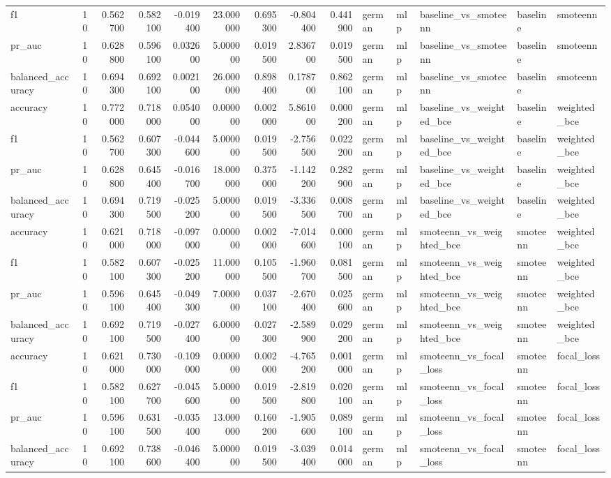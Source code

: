 \begin{tabular}{lrrrrrrrrlllll}
f1 & 10 & 0.562700 & 0.582100 & -0.019400 & 23.000000 & 0.695300 & -0.804400 & 0.441900 & german & mlp & baseline_vs_smoteenn & baseline & smoteenn \\
pr_auc & 10 & 0.628800 & 0.596100 & 0.032600 & 5.000000 & 0.019500 & 2.836700 & 0.019500 & german & mlp & baseline_vs_smoteenn & baseline & smoteenn \\
balanced_accuracy & 10 & 0.694300 & 0.692100 & 0.002100 & 26.000000 & 0.898400 & 0.178700 & 0.862100 & german & mlp & baseline_vs_smoteenn & baseline & smoteenn \\
accuracy & 10 & 0.772000 & 0.718000 & 0.054000 & 0.000000 & 0.002000 & 5.861000 & 0.000200 & german & mlp & baseline_vs_weighted_bce & baseline & weighted_bce \\
f1 & 10 & 0.562700 & 0.607300 & -0.044600 & 5.000000 & 0.019500 & -2.756500 & 0.022200 & german & mlp & baseline_vs_weighted_bce & baseline & weighted_bce \\
pr_auc & 10 & 0.628800 & 0.645400 & -0.016700 & 18.000000 & 0.375000 & -1.142200 & 0.282900 & german & mlp & baseline_vs_weighted_bce & baseline & weighted_bce \\
balanced_accuracy & 10 & 0.694300 & 0.719500 & -0.025200 & 5.000000 & 0.019500 & -3.336500 & 0.008700 & german & mlp & baseline_vs_weighted_bce & baseline & weighted_bce \\
accuracy & 10 & 0.621000 & 0.718000 & -0.097000 & 0.000000 & 0.002000 & -7.014600 & 0.000100 & german & mlp & smoteenn_vs_weighted_bce & smoteenn & weighted_bce \\
f1 & 10 & 0.582100 & 0.607300 & -0.025200 & 11.000000 & 0.105500 & -1.960700 & 0.081500 & german & mlp & smoteenn_vs_weighted_bce & smoteenn & weighted_bce \\
pr_auc & 10 & 0.596100 & 0.645400 & -0.049300 & 7.000000 & 0.037100 & -2.670400 & 0.025600 & german & mlp & smoteenn_vs_weighted_bce & smoteenn & weighted_bce \\
balanced_accuracy & 10 & 0.692100 & 0.719500 & -0.027400 & 6.000000 & 0.027300 & -2.589900 & 0.029200 & german & mlp & smoteenn_vs_weighted_bce & smoteenn & weighted_bce \\
accuracy & 10 & 0.621000 & 0.730000 & -0.109000 & 0.000000 & 0.002000 & -4.765200 & 0.001000 & german & mlp & smoteenn_vs_focal_loss & smoteenn & focal_loss \\
f1 & 10 & 0.582100 & 0.627700 & -0.045600 & 5.000000 & 0.019500 & -2.819800 & 0.020100 & german & mlp & smoteenn_vs_focal_loss & smoteenn & focal_loss \\
pr_auc & 10 & 0.596100 & 0.631500 & -0.035400 & 13.000000 & 0.160200 & -1.905600 & 0.089100 & german & mlp & smoteenn_vs_focal_loss & smoteenn & focal_loss \\
balanced_accuracy & 10 & 0.692100 & 0.738600 & -0.046400 & 5.000000 & 0.019500 & -3.039400 & 0.014000 & german & mlp & smoteenn_vs_focal_loss & smoteenn & focal_loss \\
\bottomrule
\end{tabular}
